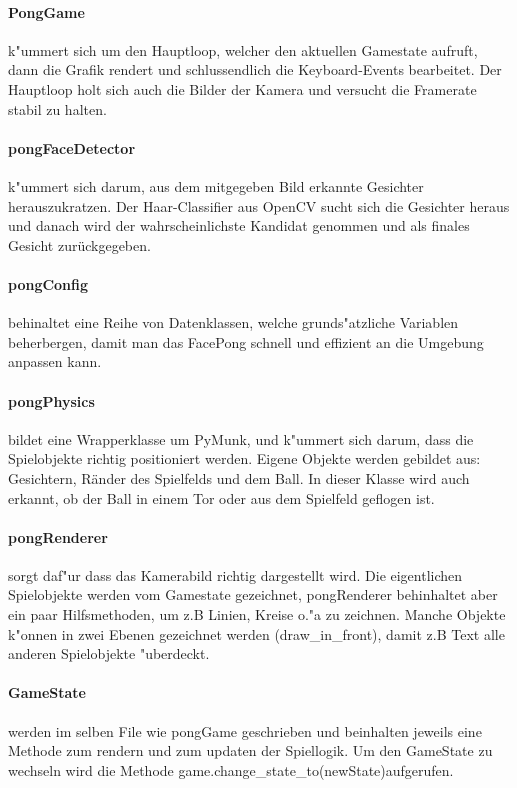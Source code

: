 \documentclass[12pt]{article}
\begin{document}
\paragraph{PongGame}
k"ummert sich um den Hauptloop, welcher den aktuellen Gamestate aufruft, dann die 
Grafik rendert und schlussendlich die Keyboard-Events bearbeitet.
Der Hauptloop holt sich auch die Bilder der Kamera und versucht die Framerate 
stabil zu halten.
\paragraph{pongFaceDetector}
k"ummert sich darum, aus dem mitgegeben Bild erkannte Gesichter herauszukratzen.
Der Haar-Classifier aus OpenCV sucht sich die Gesichter heraus und danach wird
der wahrscheinlichste Kandidat genommen und als finales Gesicht zurückgegeben.
\paragraph{pongConfig}
behinaltet eine Reihe von Datenklassen, welche grunds"atzliche Variablen beherbergen,
damit man das FacePong schnell und effizient an die Umgebung anpassen kann.
\paragraph{pongPhysics}
bildet eine Wrapperklasse um PyMunk, und k"ummert sich darum, dass die Spielobjekte richtig
positioniert werden. Eigene Objekte werden gebildet aus: Gesichtern, Ränder des Spielfelds und 
dem Ball. In dieser Klasse wird auch erkannt, ob der Ball in einem Tor oder aus dem Spielfeld
geflogen ist.
\paragraph{pongRenderer}
sorgt daf"ur dass das Kamerabild richtig dargestellt wird. Die eigentlichen Spielobjekte
werden vom Gamestate gezeichnet, pongRenderer behinhaltet aber ein paar Hilfsmethoden,
um z.B Linien, Kreise o."a zu zeichnen. Manche Objekte k"onnen in zwei Ebenen gezeichnet
werden (draw\_in\_front), damit z.B Text alle anderen Spielobjekte "uberdeckt.
\paragraph{GameState}
werden im selben File wie pongGame geschrieben und beinhalten jeweils eine Methode zum 
rendern und zum updaten der Spiellogik. Um den GameState zu wechseln wird die Methode
game.change\_state\_to(newState)aufgerufen.
\end{document}
